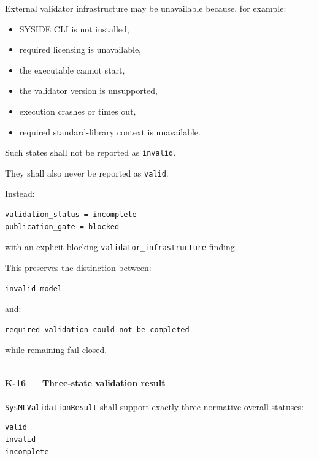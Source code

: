 External validator infrastructure may be unavailable because, for example:

\begin{itemize}
\tightlist
\item
  SYSIDE CLI is not installed,
\item
  required licensing is unavailable,
\item
  the executable cannot start,
\item
  the validator version is unsupported,
\item
  execution crashes or times out,
\item
  required standard-library context is unavailable.
\end{itemize}

Such states shall not be reported as \texttt{invalid}.

They shall also never be reported as \texttt{valid}.

Instead:

\begin{verbatim}
validation_status = incomplete
publication_gate = blocked
\end{verbatim}

with an explicit blocking \texttt{validator\_infrastructure} finding.

This preserves the distinction between:

\begin{verbatim}
invalid model
\end{verbatim}

and:

\begin{verbatim}
required validation could not be completed
\end{verbatim}

while remaining fail-closed.

\begin{center}\rule{0.5\linewidth}{0.5pt}\end{center}

\hypertarget{k-16--three-state-validation-result}{%
\paragraph{K-16 --- Three-state validation result}\label{k-16--three-state-validation-result}}

\texttt{SysMLValidationResult} shall support exactly three normative overall statuses:

\begin{verbatim}
valid
invalid
incomplete
\end{verbatim}

